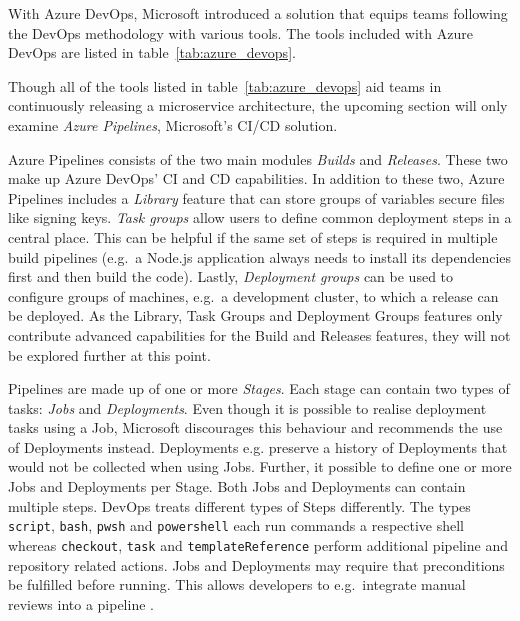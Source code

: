 With Azure DevOps, Microsoft introduced a solution that equips teams following
the DevOps methodology with various tools. The tools included with Azure DevOps
are listed in table~\ref{tab:azure_devops}.


Though all of the tools listed in table~\ref{tab:azure_devops} aid teams in
continuously releasing a microservice architecture, the upcoming section will
only examine \textit{Azure Pipelines}, Microsoft's \ac{CI}/\ac{CD} solution.

Azure Pipelines consists of the two main modules \textit{Builds} and
\textit{Releases}. These two make up Azure DevOps' \ac{CI} and \ac{CD}
capabilities. In addition to these two, Azure Pipelines includes a
\textit{Library} feature that can store groups of variables secure files like
signing keys. \textit{Task groups} allow users to define common deployment
steps in a central place. This can be helpful if the same set of steps is
required in multiple build pipelines (e.g.\ a Node.js application always needs
to install its dependencies first and then build the code). Lastly,
\textit{Deployment groups} can be used to configure groups of machines, e.g.\ a
development cluster, to which a release can be deployed. As the Library, Task
Groups and Deployment Groups features only contribute advanced capabilities for
the Build and Releases features, they will not be explored further at this
point.

Pipelines are made up of one or more \textit{Stages}. Each stage can contain
two types of tasks: \textit{Jobs} and \textit{Deployments}. Even though it is
possible to realise deployment tasks using a Job, Microsoft discourages this
behaviour and recommends the use of Deployments instead. Deployments e.g.
preserve a history of Deployments that would not be collected when using Jobs.
Further, it possible to define one or more Jobs and Deployments per Stage. Both
Jobs and Deployments can contain multiple steps. DevOps treats different types
of Steps differently. The types \texttt{script}, \texttt{bash}, \texttt{pwsh}
and \texttt{powershell} each run commands a respective shell whereas
\texttt{checkout}, \texttt{task} and \texttt{templateReference} perform
additional pipeline and repository related actions. Jobs and Deployments may
require that preconditions be fulfilled before running. This allows developers
to e.g.\ integrate manual reviews into a pipeline \autocite{MicrosoftJobs2019}.

